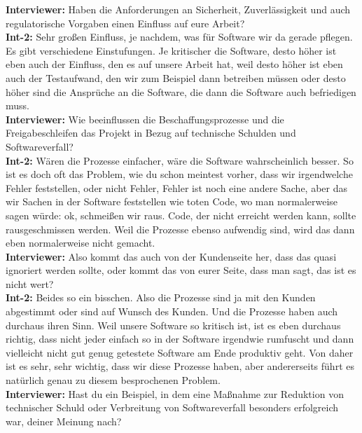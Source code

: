 \textbf{Interviewer:} Haben die Anforderungen an Sicherheit, Zuverlässigkeit und auch regulatorische Vorgaben einen Einfluss auf eure Arbeit?\\
\textbf{Int-2:} Sehr großen Einfluss, je nachdem, was für Software wir da gerade pflegen. Es gibt verschiedene Einstufungen. Je kritischer die Software, desto höher ist eben auch der Einfluss, den es auf unsere Arbeit hat, weil desto höher ist eben auch der Testaufwand, den wir zum Beispiel dann betreiben müssen oder desto höher sind die Ansprüche an die Software, die dann die Software auch befriedigen muss. \\
\textbf{Interviewer:} Wie beeinflussen die Beschaffungsprozesse und die Freigabeschleifen das Projekt in Bezug auf technische Schulden und Softwareverfall?\\
\textbf{Int-2:} Wären die Prozesse einfacher, wäre die Software wahrscheinlich besser. So ist es doch oft das Problem, wie du schon meintest vorher, dass wir irgendwelche Fehler feststellen, oder nicht Fehler, Fehler ist noch eine andere Sache, aber das wir Sachen in der Software feststellen wie toten Code, wo man normalerweise sagen würde: ok, schmeißen wir raus. Code, der nicht erreicht werden kann, sollte rausgeschmissen werden. Weil die Prozesse ebenso aufwendig sind, wird das dann eben normalerweise nicht gemacht. \\
\textbf{Interviewer:} Also kommt das auch von der Kundenseite her, dass das quasi ignoriert werden sollte, oder kommt das von eurer Seite, dass man sagt, das ist es nicht wert? \\
\textbf{Int-2:} Beides so ein bisschen. Also die Prozesse sind ja mit den Kunden abgestimmt oder sind auf Wunsch des Kunden. Und die Prozesse haben auch durchaus ihren Sinn. Weil unsere Software so kritisch ist, ist es eben durchaus richtig, dass nicht jeder einfach so in der Software irgendwie rumfuscht und dann vielleicht nicht gut genug getestete Software am Ende produktiv geht. Von daher ist es sehr, sehr wichtig, dass wir diese Prozesse haben, aber andererseits führt es natürlich genau zu diesem besprochenen Problem. \\
\textbf{Interviewer:} Hast du ein Beispiel, in dem eine Maßnahme zur Reduktion von technischer Schuld oder Verbreitung von Softwareverfall besonders erfolgreich war, deiner Meinung nach? \\
